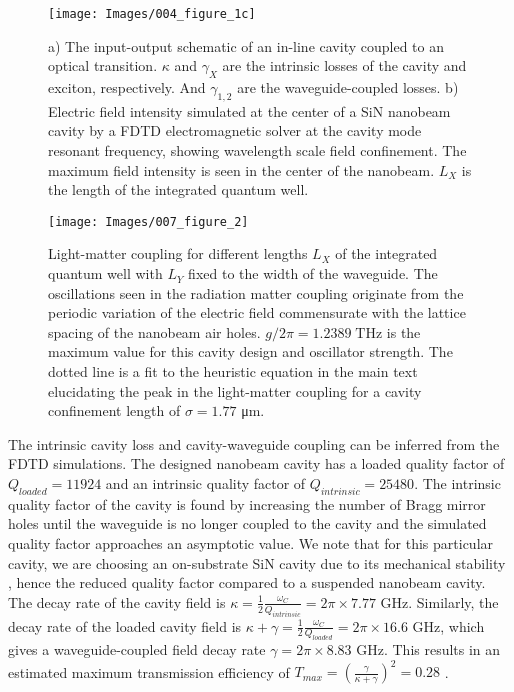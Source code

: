 \documentclass{achemso}
\begin{document}
\begin{figure}
	\centering
	\texttt{[image: Images/004\_figure\_1c]}
	\caption{a) The input-output schematic of an in-line cavity coupled to an optical transition. $\kappa$ and $\gamma_{X}$ are the intrinsic losses of the cavity and exciton, respectively. And $\gamma_{1,2}$ are the waveguide-coupled losses. b) Electric field intensity simulated at the center of a SiN nanobeam cavity by a FDTD electromagnetic solver at the cavity mode resonant frequency, showing wavelength scale field confinement. The maximum field intensity is seen in the center of the nanobeam. $L_{X}$ is the length of the integrated quantum well.}
	\label{fig:003figure1c}
\end{figure}



\begin{figure}
	\centering
	\texttt{[image: Images/007\_figure\_2]}
	\caption{Light-matter coupling for different lengths $L_{X}$ of the integrated quantum well with $L_{Y}$ fixed to the width of the waveguide. The oscillations seen in the radiation matter coupling originate from the periodic variation of the electric field commensurate with the lattice spacing of the nanobeam air holes. $g/2\pi = 1.2389 \; \si{\tera \hertz}$ is the maximum value for this cavity design and oscillator strength. The dotted line is a fit to the heuristic equation in the main text elucidating the peak in the light-matter coupling for a cavity confinement length of $\sigma=1.77$ \si{\micro \meter}.}
	\label{fig:gvsl}
\end{figure}

The intrinsic cavity loss and cavity-waveguide coupling can be inferred from the FDTD simulations. The designed nanobeam cavity has a loaded quality factor of $Q_{loaded}=11924$ and an intrinsic quality factor of $Q_{intrinsic}=25480$. The intrinsic quality factor of the cavity is found by increasing the number of Bragg mirror holes until the waveguide is no longer coupled to the cavity and the simulated quality factor approaches an asymptotic value. We note that for this particular cavity, we are choosing an on-substrate SiN cavity due to its mechanical stability \cite{fryett_encapsulated_2018}, hence the reduced quality factor compared to a suspended nanobeam cavity. The decay rate of the cavity field is $\kappa = \frac{1}{2} \frac{\omega_{C}}{Q_{intrinsic}} = 2 \pi \times 7.77$ \si{\giga \hertz}. Similarly, the decay rate of the loaded cavity field is $\kappa + \gamma = \frac{1}{2} \frac{\omega_{C}}{Q_{loaded}} = 2 \pi \times 16.6$ \si{\giga \hertz}, which gives a waveguide-coupled field decay rate $\gamma = 2 \pi \times 8.83$ \si{\giga \hertz}. This results in an estimated maximum transmission efficiency of $T_{max} = \left ( \frac{\gamma}{\kappa + \gamma} \right )^{2} = 0.28$ \cite{xu_scattering-theory_2000}.
\end{document}
